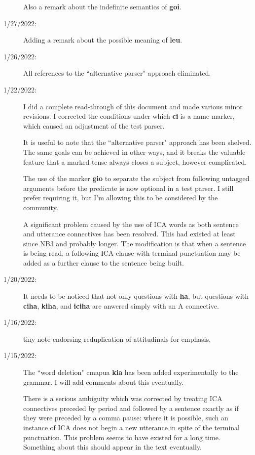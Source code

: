 \documentclass[12pt]{book}
\begin{document}
\begin{description}
Also a remark about the indefinite semantics of {\bf goi}.

\item[1/27/2022:]  Adding a remark about the possible meaning of {\bf leu}.

\item[1/26/2022:]  All references to the ``alternative parser" approach eliminated.

\item[1/22/2022:]  I did a complete read-through of this document and made various minor revisions.  I corrected the conditions under which {\bf ci} is a name marker, which caused an adjustment of the test parser.


It is useful to note that the ``alternative parser" approach has been shelved.  The same goals can be achieved in other ways, and it breaks the valuable feature that a marked tense always closes a subject, however complicated.

The use of the marker {\bf gio} to separate the subject from following untagged arguments before the predicate is now optional in a test parser.  I still prefer requiring it, but I'm allowing this to be considered by the community.

A significant problem caused by the use of ICA words as both sentence and utterance connectives has been resolved.  This had existed at least since NB3 and probably longer.  The modification is that when a sentence is being read, a following ICA clause with terminal punctuation may be added as a further clause to the sentence being built.

\item[1/20/2022:]  It needs to be noticed that not only questions with {\bf ha}, but questions with {\bf ciha}, {\bf kiha}, and {\bf iciha} are anwered simply with an A connective.

\item[1/16/2022:] tiny note endorsing reduplication of attitudinals for emphasis.

\item[1/15/2022:]  The ``word deletion" cmapua {\bf kia} has been added experimentally to the grammar.  I will add comments about this eventually.

There is a serious ambiguity which was corrected by treating ICA connectives preceded by period and followed by a sentence exactly as if they were preceded by a comma pause:  where it is possible, such an instance of ICA does not begin a new utterance in spite of the terminal punctuation.  This problem seems to have existed for a long time.  Something about this should appear in the text eventually.


\end{description}
\end{document}
